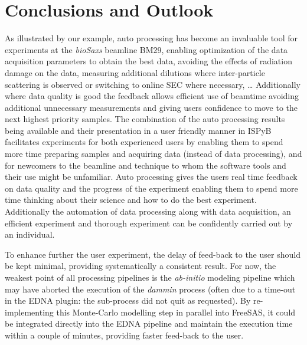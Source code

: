 \documentclass[preprint,pdf]{iucr}              %
\begin{document}
\section{Conclusions and Outlook}
As illustrated by our example, auto processing has become an invaluable tool for
experiments at the \textit{bioSaxs} beamline BM29, enabling optimization of the
data acquisition parameters to obtain the best data, avoiding the effects of
radiation damage on the data, measuring additional dilutions where inter-particle 
scattering is observed or switching to online SEC where necessary, \ldots 
Additionally where data quality is good the feedback allows efficient use of
beamtime avoiding additional unnecessary measurements and giving users confidence 
to move to the next highest priority samples.
The combination of the auto processing results being available and their presentation 
in a user friendly manner in ISPyB facilitates experiments for both experienced users 
by enabling them to spend more time preparing samples and acquiring data 
(instead of data processing), and for newcomers to the beamline and technique 
to whom  the software tools and their use might be unfamiliar. 
Auto processing gives the users real time feedback on data quality and the progress 
of the experiment enabling them to spend more time thinking about their science and 
how to do the best experiment.
Additionally the automation of data processing along with data acquisition, an
efficient experiment and thorough experiment can be confidently carried out by an individual.

To enhance further the user experiment, the delay of feed-back to the user
should be kept minimal, providing systematically a consistent result.
For now, the weakest point of all processing pipelines is the
\textit{ab-initio} modeling pipeline which may have aborted the
execution of the \textit{dammin} process (often due to a time-out in
the EDNA plugin: the sub-process did not quit as requested).
By re-implementing this Monte-Carlo modelling step in parallel into FreeSAS, it
could be integrated directly into the EDNA pipeline and maintain the execution
time within a couple of minutes, providing faster feed-back to the user.

\end{document}
